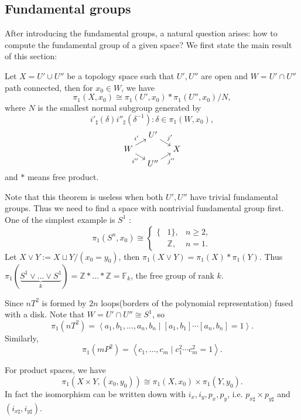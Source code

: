 \subsection{Fundamental groups}
\label{sub:Fundamental groups}

After introducing the fundamental groups, a natural question arises:
how to compute the fundamental group of a given space?
We first state the main result of this section:
\begin{theorem}
	\label{thm:vankampen}
    Let $X = U'\cup U''$ be a topology space such that
	$U', U''$ are open and $W = U'\cap U''$ path connected, then for $x_0\in W$,
	we have
	\[
		\pi_1(X, x_0) \cong \pi_1(U', x_0) * \pi_1(U'', x_0) / N,
	\]
	where $N$ is the smallest normal subgroup generated by
	\[
	i'_\sharp(\delta) i''_\sharp(\delta^{-1}): \delta\in \pi_1(W, x_0),
	\]
	\begin{equation*}
	\begin{tikzcd}[sep=small, row sep=tiny, cramped]
		&U'\drar["j'"]\\ W\urar["i'"]\drar["i''"'] &&X\\ &U''\urar["j''"']
	\end{tikzcd}
	\end{equation*}
	and $*$ means free product.
\end{theorem}

Note that this theorem is useless when both $U', U''$ have trivial fundamental groups.
Thus we need to find a space with nontrivial fundamental group first.
One of the simplest example is $S^1$ :
\[
\pi_1(S^n, x_0) \cong \left\{\begin{aligned}
		\{&1\}, & n\ge 2,\\ &\mathbb{Z}, & n = 1.
\end{aligned}\right.
\]
Let $X\vee Y := X\sqcup Y / (x_0=y_0)$, then $\pi_1(X\vee Y) = \pi_1(X)*\pi_1(Y)$.
Thus $\pi_1(\underbrace{S^1\vee \dots\vee S^1}_{k}) = \mathbb{Z}*\dots*\mathbb{Z}
= \mathbb{F}_k$, the free group of rank $k$.

\begin{example}
    Since $nT^2$ is formed by $2n$ loops(borders of the polynomial representation)
	fused with a disk. Note that $W = U'\cap U'' \cong S^1$, so
	\[
	\pi_1(nT^2) = \left<a_1,b_1,\dots,a_n,b_n \mid [a_1,b_1]\cdots[a_n,b_n]=1\right>.
	\]
	Similarly,
	\[
	\pi_1(mP^2) = \left<c_1,\dots,c_m \mid c_1^2\cdots c_m^2 = 1 \right>.
	\]
\end{example}
\begin{example}
	For product spaces, we have
    \[
    \pi_1(X\times Y, (x_0, y_0)) \cong \pi_1(X, x_0) \times \pi_1(Y, y_0).
    \]
	In fact the isomorphism can be written down with $i_x, i_y, p_x, p_y$,
	i.e. $p_{x\sharp} \times  p_{y\sharp}$ and $(i_{x\sharp}, i_{y\sharp})$.
\end{example}
